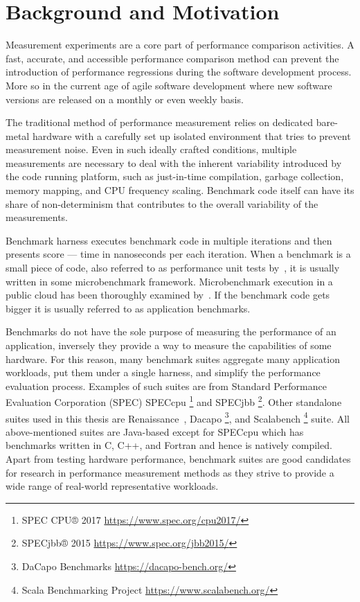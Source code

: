 \chapter{Background and Motivation}
\label{chap:background}

Measurement experiments are a core part of performance comparison activities.
A fast, accurate, and accessible performance comparison method can prevent the introduction of performance regressions during the software development process.
More so in the current age of agile software development where new software versions are released on a monthly or even weekly basis.

The traditional method of performance measurement relies on dedicated bare-metal hardware with a carefully set up isolated environment that tries to prevent measurement noise. 
Even in such ideally crafted conditions, multiple measurements are necessary to deal with the inherent variability introduced by the code running platform, such as just-in-time compilation, garbage collection, memory mapping, and CPU frequency scaling.
Benchmark code itself can have its share of non-determinism that contributes to the overall variability of the measurements.

Benchmark harness executes benchmark code in multiple iterations and then presents score --- time in nanoseconds per each iteration.
When a benchmark is a small piece of code, also referred to as performance unit tests by~\citet{horky2015unit}, it is usually written in some microbenchmark framework.
Microbenchmark execution in a public cloud has been thoroughly examined by~\citet{laaber2019software}.
If the benchmark code gets bigger it is usually referred to as application benchmarks.

Benchmarks do not have the sole purpose of measuring the performance of an application, inversely they provide a way to measure the capabilities of some hardware.
For this reason, many benchmark suites aggregate many application workloads, put them under a single harness, and simplify the performance evaluation process.
Examples of such suites are from Standard Performance Evaluation Corporation (SPEC) SPECcpu \footnote{SPEC CPU® 2017 \url{https://www.spec.org/cpu2017/}} and SPECjbb \footnote{SPECjbb® 2015 \url{https://www.spec.org/jbb2015/}}.
Other standalone suites used in this thesis are Renaissance~\cite{prokopec2019renaissance}, Dacapo \footnote{DaCapo Benchmarks \url{https://dacapo-bench.org/}}, and Scalabench \footnote{Scala Benchmarking Project \url{https://www.scalabench.org/}} suite.
All above-mentioned suites are Java-based except for SPECcpu which has benchmarks written in C, C++, and Fortran and hence is natively compiled.
Apart from testing hardware performance, benchmark suites are good candidates for research in performance measurement methods as they strive to provide a wide range of real-world representative workloads.

